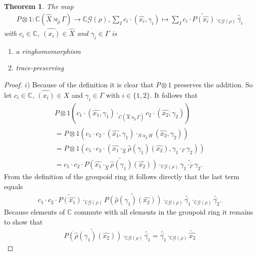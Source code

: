 \documentclass[12pt,a4paper]{scrartcl}
\newtheorem{Theorem}{Theorem}[section]
\numberwithin{equation}{section}
\newcommand{\C}{\mathbb{C}} %
\newcommand{\2}{\mathbb{Z} / 2 \mathbb{Z}}
\newcommand{\G}{\mathcal{G}}
\newcommand{\1}{\bar{1}}
\newcommand{\0}{\bar{0}}
\begin{document}
\begin{Theorem}
	The map 
	\begin{align*}
		P \otimes 1: \C(\hat{X} \rtimes_{\hat{\rho}} \Gamma) \to \C\G(\rho), \sum_I c_i \cdot (\hat{x_i}, \gamma_i) \mapsto \sum_I c_i \cdot \widetilde{P(\hat{x_i})} \cdot_{\C\G(\rho)} \widetilde{\bar{\gamma_i}} 
	\end{align*}
	 with $c_i \in \C$, $\hat{(x_i)} \in \hat{X}$ and $\gamma_i \in \Gamma$ is
	\begin{enumerate}
		\item a ringhomomorphism
		\item trace-preserving
	\end{enumerate}
\end{Theorem}
\begin{proof}
	$i)$ Because of the definition it is clear that $P \otimes 1$ preserves the addition. So let $c_i \in \C$, $\hat{(x_i)} \in \hat{X}$ and $\gamma_i \in \Gamma$ with $i \in \{1,2\}$. It follows that
	\begin{align*}
		P \otimes 1(c_1 \cdot (\hat{x_1}, \gamma_1) \cdot_{C(\hat{X} \rtimes_{\hat{\rho}} \Gamma)} c_2 \cdot (\hat{x_2}, \gamma_2))  \\
		= P \otimes 1(c_1 \cdot  c_2 \cdot (\hat{x_1}, \gamma_1) \cdot_{N \rtimes_{\hat{\rho}} H} (\hat{x_2}, \gamma_2)) \\
		=  P \otimes 1(c_1 \cdot  c_2 \cdot (\hat{x_1} \cdot_{\hat{X}} \hat{\rho}(\gamma_1)(\hat{x_2}), \gamma_1 \cdot_{\Gamma} \gamma_2)) \\
		= c_1 \cdot  c_2 \cdot \widetilde{P(\hat{x_1} \cdot_{\hat{X}} \hat{\rho}(\gamma_1)(\hat{x_2}))} \cdot_{\C\G(\rho)} \widetilde{\overline{\gamma_1 \cdot_{\Gamma} \gamma_2}}.
	\end{align*}
	From the definition of the groupoid ring it follows directly that the last term equals 
	\begin{align*}
		c_1 \cdot  c_2 \cdot \widetilde{P(\hat{x_1})} \cdot_{\C\G(\rho)} \widetilde{P(\hat{\rho}(\gamma_1)(\hat{x_2}))} \cdot_{\C\G(\rho)} \widetilde{\bar{\gamma_1}} \cdot_{\C\G(\rho)} \widetilde{\bar{\gamma_2}}.
	\end{align*}
	Because elements of $\C$ commute with all elements in the groupoid ring it remains to show that 
	\begin{align*}
		\widetilde{P(\hat{\rho}(\gamma_1)(\hat{x_2}))} \cdot_{\C\G(\rho)} \widetilde{\bar{\gamma_1}} = \widetilde{\bar{\gamma_1}} \cdot_{\C\G(\rho)} \tilde{\hat{x_2}} 
	\end{align*}

\end{proof}
\end{document}
